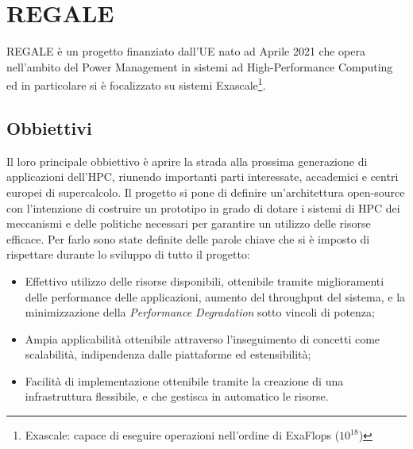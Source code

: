 \chapter{REGALE}\label{chap:4_REGALE}
REGALE\cite{REGALE} è un progetto finanziato dall'UE\cite{ue_REGALE} nato ad Aprile 2021 che opera nell'ambito del Power Management in sistemi ad High-Performance Computing ed in particolare si è focalizzato su sistemi Exascale\footnote{Exascale: capace di eseguire operazioni nell'ordine di ExaFlops ($10^{18}$)}.



\section{Obbiettivi}
Il loro principale obbiettivo è aprire la strada alla prossima generazione di applicazioni dell'HPC, riunendo importanti parti interessate, accademici e centri europei di supercalcolo. Il progetto si pone di definire un'architettura open-source con l'intenzione di costruire un prototipo in grado di dotare i sistemi di HPC dei meccanismi e delle politiche necessari per garantire un utilizzo delle risorse efficace\cite{ue_REGALE}. Per farlo sono state definite delle parole chiave che si è imposto di rispettare durante lo sviluppo di tutto il progetto:
\begin{itemize}
    \item Effettivo utilizzo delle risorse disponibili, ottenibile tramite miglioramenti delle performance delle applicazioni, aumento del throughput del sistema, e la minimizzazione della \emph{Performance Degradation} sotto vincoli di potenza;
    \item Ampia applicabilità ottenibile attraverso l'inseguimento di concetti come scalabilità, indipendenza dalle piattaforme ed estensibilità;
    \item Facilità di implementazione ottenibile tramite la creazione di una infrastruttura flessibile, e che gestisca in automatico le risorse.
\end{itemize}


